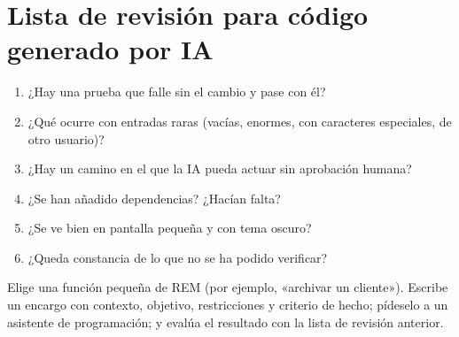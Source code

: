 \section{Lista de revisión para código generado por IA}
\begin{enumerate}
\item ¿Hay una prueba que falle sin el cambio y pase con él?
\item ¿Qué ocurre con entradas raras (vacías, enormes, con caracteres especiales, de otro usuario)?
\item ¿Hay un camino en el que la IA pueda actuar sin aprobación humana?
\item ¿Se han añadido dependencias? ¿Hacían falta?
\item ¿Se ve bien en pantalla pequeña y con tema oscuro?
\item ¿Queda constancia de lo que no se ha podido verificar?
\end{enumerate}

\begin{checkbox}
Elige una función pequeña de REM (por ejemplo, «archivar un cliente»). Escribe un encargo con contexto, objetivo, restricciones y criterio de hecho; pídeselo a un asistente de programación; y evalúa el resultado con la lista de revisión anterior.
\end{checkbox}

